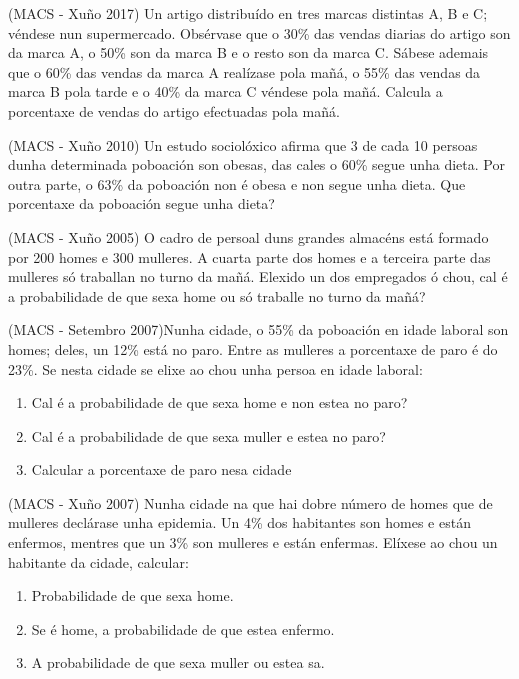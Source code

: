\Exercicio  (MACS - Xuño 2017) Un artigo distribuído en tres marcas distintas A, B e C; véndese nun supermercado. Obsérvase que o 30\% das vendas diarias do artigo son da marca A, o 50\% son da marca B e o resto son da marca C. Sábese ademais que o 60\% das vendas da marca A realízase pola mañá, o 55\% das vendas da marca B pola tarde e o 40\% da marca C véndese pola mañá. Calcula a porcentaxe de vendas do artigo efectuadas pola mañá.

\Exercicio  (MACS - Xuño 2010) Un estudo sociolóxico afirma que 3 de cada 10 persoas dunha determinada poboación son obesas, das cales o 60\% segue unha dieta. Por outra parte, o 63\% da poboación non é obesa e non segue unha dieta. Que porcentaxe da poboación segue unha dieta?

\Exercicio  (MACS - Xuño 2005) O cadro de persoal duns grandes almacéns está formado por 200 homes e 300 mulleres. A cuarta parte dos homes e a terceira parte das mulleres só traballan no turno da mañá. Elexido un dos empregados ó chou, cal é a probabilidade de que sexa home ou só traballe no turno da mañá?

\Exercicio  (MACS - Setembro 2007)Nunha cidade, o 55\% da poboación en idade laboral son homes; deles, un 12\% está no paro. Entre as mulleres a porcentaxe de paro é do 23\%. Se nesta cidade se elixe ao chou unha persoa en idade laboral:

\begin{enumerate}[topsep=0pt,itemsep=0pt]
	\item Cal é a probabilidade de que sexa home e non estea no paro?
	\item Cal é a probabilidade de que sexa muller e estea no paro?
	\item Calcular a porcentaxe de paro nesa cidade
\end{enumerate}

   
\Exercicio  (MACS - Xuño 2007) Nunha cidade na que hai dobre número de homes que de mulleres declárase unha epidemia. Un 4\% dos habitantes son homes e están enfermos, mentres que un 3\% son mulleres e están enfermas. Elíxese ao chou un habitante da cidade, calcular:

\begin{enumerate}[topsep=0pt,itemsep=0pt,itemsep=0pt]
	\item Probabilidade de que sexa home.
	\item Se é home, a probabilidade de que estea enfermo.
	\item A probabilidade de que sexa muller ou estea sa.
\end{enumerate}


